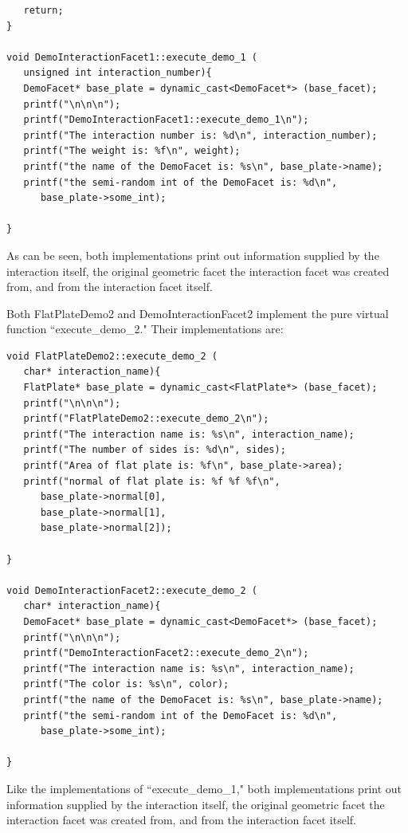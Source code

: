 \begin{description}
\begin{verbatim}
   return;
}

void DemoInteractionFacet1::execute_demo_1 (
   unsigned int interaction_number){
   DemoFacet* base_plate = dynamic_cast<DemoFacet*> (base_facet);
   printf("\n\n\n");
   printf("DemoInteractionFacet1::execute_demo_1\n");
   printf("The interaction number is: %d\n", interaction_number);
   printf("The weight is: %f\n", weight);
   printf("the name of the DemoFacet is: %s\n", base_plate->name);
   printf("the semi-random int of the DemoFacet is: %d\n",
      base_plate->some_int);

}

\end{verbatim}

As can be seen, both implementations print out information supplied
by the interaction itself, the original geometric facet the
interaction facet was created from, and from the interaction facet
itself.

Both FlatPlateDemo2 and DemoInteractionFacet2 implement the pure
virtual function ``execute\_demo\_2." Their implementations are:

\begin{verbatim}
void FlatPlateDemo2::execute_demo_2 (
   char* interaction_name){
   FlatPlate* base_plate = dynamic_cast<FlatPlate*> (base_facet);
   printf("\n\n\n");
   printf("FlatPlateDemo2::execute_demo_2\n");
   printf("The interaction name is: %s\n", interaction_name);
   printf("The number of sides is: %d\n", sides);
   printf("Area of flat plate is: %f\n", base_plate->area);
   printf("normal of flat plate is: %f %f %f\n",
      base_plate->normal[0],
      base_plate->normal[1],
      base_plate->normal[2]);

}

void DemoInteractionFacet2::execute_demo_2 (
   char* interaction_name){
   DemoFacet* base_plate = dynamic_cast<DemoFacet*> (base_facet);
   printf("\n\n\n");
   printf("DemoInteractionFacet2::execute_demo_2\n");
   printf("The interaction name is: %s\n", interaction_name);
   printf("The color is: %s\n", color);
   printf("the name of the DemoFacet is: %s\n", base_plate->name);
   printf("the semi-random int of the DemoFacet is: %d\n",
      base_plate->some_int);

}
\end{verbatim}

Like the implementations of ``execute\_demo\_1," 
both implementations print out information supplied
by the interaction itself, the original geometric facet the
interaction facet was created from, and from the interaction facet
itself.


\end{description}
